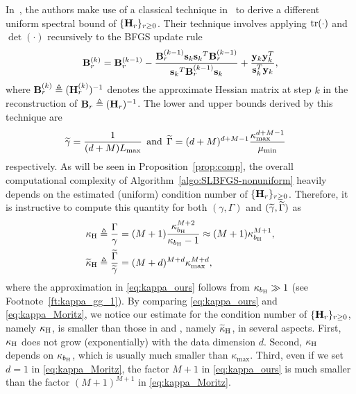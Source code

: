 \documentclass[10pt,twocolumn,journal]{IEEEtran}
\begin{document}

\begin{remark}\label{rmk:spectral_bound}
In~\cite{Mokh_15,Byrd_16a,Moritz_16}, the authors make use of a classical technique in~\cite{Liu_89} to derive a different uniform spectral bound of $\{\mathbf{H}_r\}_{r\ge 0}$. Their technique involves applying $\operatorname{tr}(\cdot)$ and $\det(\cdot)$ recursively to the BFGS update rule
\begin{align}
\mathbf{B}_r^{(k)} = \mathbf{B}_r^{(k-1)}-\frac{\mathbf{B}_r^{(k-1)}\mathbf{s}_k{\mathbf{s}_k}^T\mathbf{B}_r^{(k-1)}}{{\mathbf{s}_k}^T\mathbf{B}_r^{(k-1)}\mathbf{s}_k}+\frac{\mathbf{y}_k\mathbf{y}_k^T}{\mathbf{s}_k^T\mathbf{y}_k},\label{eq:update_B}
\end{align}
where $\mathbf{B}_r^{(k)}\triangleq (\mathbf{H}_r^{(k)})^{-1}$ denotes the approximate Hessian matrix at step $k$ in the reconstruction of $\mathbf{B}_r\triangleq(\mathbf{H}_r)^{-1}$. The lower and upper bounds derived by this technique are %
\begin{align}
\tgamma = \frac{1}{(d+M)L_{\max}}\;\,\mbox{and}\;\, %
\tGamma %
&= (d+M)^{d+M-1}\frac{\kappa_{\max}^{d+M-1}}{\mu_{\min}} \nn%
\end{align}
respectively. As will be seen in Proposition~\ref{prop:comp}, the overall computational complexity of Algorithm~\ref{algo:SLBFGS-nonuniform} heavily depends on the estimated (uniform) condition number of $\{\mathbf{H}_r\}_{r\ge 0}$. Therefore, it is instructive to compute this quantity for both $(\gamma,\Gamma)$ and $(\widetilde{\gamma},\widetilde{\Gamma})$ as%
\begin{align}
\kappa_{\mathrm{H}} &\triangleq \frac{\Gamma}{\gamma} = (M+1)\frac{\kappa_{b_{\mathrm{H}}}^{M+2}}{\kappa_{b_{\mathrm{H}}}-1}\approx (M+1)\kappa_{b_{\mathrm{H}}}^{M+1},\label{eq:kappa_ours}\\
\widetilde{\kappa}_{\mathrm{H}} &\triangleq \frac{\widetilde{\Gamma}}{\widetilde{\gamma}} = (M+d)^{M+d}\kappa_{\max}^{M+d}, \label{eq:kappa_Moritz}
\end{align}
where the approximation in \eqref{eq:kappa_ours} follows from $\kappa_{b_{\mathrm{H}}}\gg 1$ (see Footnote~\ref{ft:kappa_gg_1}). By comparing \eqref{eq:kappa_ours} and \eqref{eq:kappa_Moritz}, we notice our estimate for the condition number of $\{\mathbf{H}_r\}_{r\ge 0}$, namely $\kappa_{\mathrm{H}}$, is smaller than those in \cite{Byrd_16a} and \cite{Moritz_16}, namely $\widetilde{\kappa}_{\mathrm{H}}$, in several aspects. First, $\kappa_{\mathrm{H}}$ does not grow (exponentially) with the data dimension $d$. Second, $\kappa_{\mathrm{H}}$ depends on $\kappa_{b_{\mathrm{H}}}$, which is usually much smaller than $\kappa_{\max}$. Third, even if we set $d=1$ in \eqref{eq:kappa_Moritz}, the factor $M+1$ in \eqref{eq:kappa_ours} is much smaller than the factor $(M+1)^{M+1}$ in \eqref{eq:kappa_Moritz}. %

\end{remark}
\end{document}
